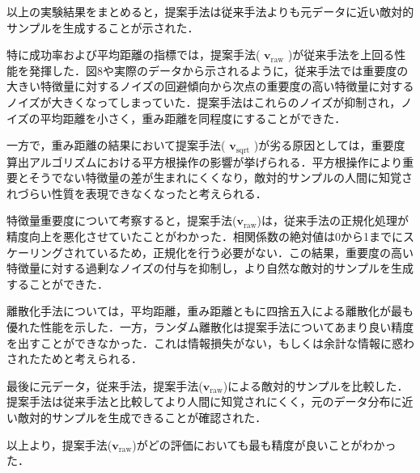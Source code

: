 以上の実験結果をまとめると，提案手法は従来手法よりも元データに近い敵対的サンプルを生成することが示された．

特に成功率および平均距離の指標では，提案手法( $\bm{v}_{\mathrm{raw}}$ )が従来手法を上回る性能を発揮した．図8や実際のデータから示されるように，従来手法では重要度の大きい特徴量に対するノイズの回避傾向から次点の重要度の高い特徴量に対するノイズが大きくなってしまっていた．提案手法はこれらのノイズが抑制され，ノイズの平均距離を小さく，重み距離を同程度にすることができた．

一方で，重み距離の結果において提案手法( $\bm{v}_{\mathrm{sqrt}}$ )が劣る原因としては，重要度算出アルゴリズムにおける平方根操作の影響が挙げられる．平方根操作により重要とそうでない特徴量の差が生まれにくくなり，敵対的サンプルの人間に知覚されづらい性質を表現できなくなったと考えられる．

特徴量重要度について考察すると，提案手法($\bm{v}_{\mathrm{raw}}$)は，従来手法の正規化処理が精度向上を悪化させていたことがわかった．相関係数の絶対値は0から1までにスケーリングされているため，正規化を行う必要がない．この結果，重要度の高い特徴量に対する過剰なノイズの付与を抑制し，より自然な敵対的サンプルを生成することができた．

離散化手法については，平均距離，重み距離ともに四捨五入による離散化が最も優れた性能を示した．一方，ランダム離散化は提案手法についてあまり良い精度を出すことができなかった．これは情報損失がない，もしくは余計な情報に惑わされたためと考えられる．

最後に元データ，従来手法，提案手法($\bm{v}_{\mathrm{raw}}$)による敵対的サンプルを比較した．提案手法は従来手法と比較してより人間に知覚されにくく，元のデータ分布に近い敵対的サンプルを生成できることが確認された．

以上より，提案手法($\bm{v}_{\mathrm{raw}}$)がどの評価においても最も精度が良いことがわかった．